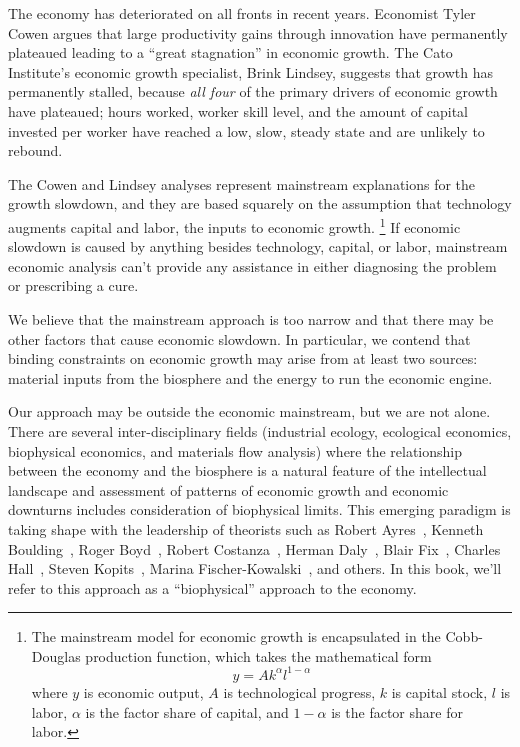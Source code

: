 The economy has deteriorated on all fronts in recent years.
Economist Tyler Cowen argues that large productivity gains 
through innovation have permanently plateaued 
leading to a ``great stagnation'' in economic growth.\cite{Cowen2011}
The Cato Institute's economic growth specialist, Brink Lindsey, 
suggests that growth has permanently stalled, 
because \emph{all four} of the primary drivers of economic growth have plateaued; 
hours worked, 
worker skill level, and
the amount of capital invested per worker 
have reached 
a low, slow, steady state 
and are unlikely to rebound.\cite{lindsey2013} 

The Cowen and Lindsey analyses represent mainstream explanations for the growth slowdown,
and they are based squarely on the assumption that technology augments 
capital and labor, the inputs to economic growth.%
	\footnote{
	The mainstream model for economic growth is encapsulated in the
	Cobb-Douglas production function, which takes the mathematical form
	\begin{equation*}
		y = A k^{\alpha} l^{1-\alpha}
	\end{equation*}	 
	where 
	$y$ is economic output, 
	$A$ is technological progress,
	$k$ is capital stock, 
	$l$ is labor, 
	$\alpha$ is the factor share of capital, and
	$1-\alpha$ is the factor share for labor.
	}
If economic slowdown is caused by anything besides
technology, capital, or labor,
mainstream economic analysis can't provide any assistance
in either diagnosing the problem or prescribing a cure.

We believe that the mainstream approach is too narrow and
that there may be other factors that cause economic slowdown.
In particular,  
we contend that binding constraints on economic growth may arise from
at least two sources: 
material inputs from the biosphere and 
the energy to run the economic engine.

Our approach may be outside the economic mainstream,
but we are not alone. 
There are several inter-disciplinary fields 
(industrial ecology, ecological economics, biophysical economics, and
materials flow analysis)
where the relationship between the 
economy and the biosphere is a natural feature of the intellectual landscape
and assessment of patterns of economic growth and economic downturns  
includes consideration of biophysical limits. 
This emerging paradigm is taking shape with the leadership of theorists
such as 
Robert Ayres~\cite{Ayres:2010ug}, 
Kenneth Boulding~\cite{Boulding1966}, 
Roger Boyd~\cite{boyd2013energy},
Robert Costanza~\cite{Cleveland:1984aa}, 
Herman Daly~\cite{Daly1977}, 
Blair Fix~\cite{Fix:2014aa},
Charles Hall~\cite{hall2011energy}, 
Steven Kopits~\cite{Kopits:2009aa},
Marina Fischer-Kowalski~\cite{F-K1999},
and others.
In this book, we'll refer to this approach as a ``biophysical'' approach
to the economy.

